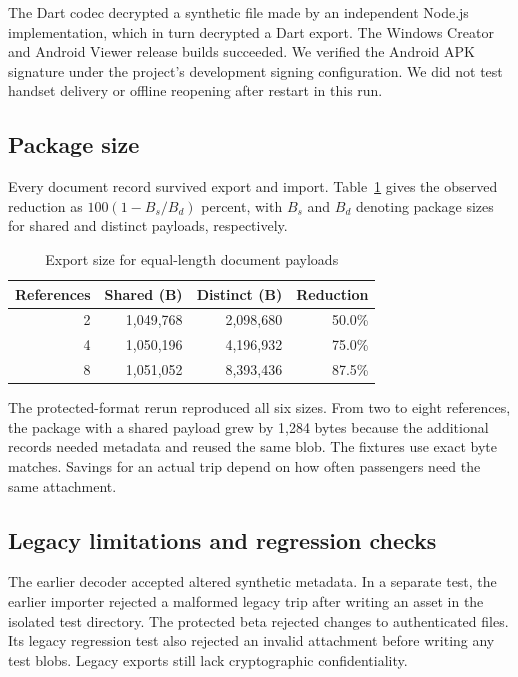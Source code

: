 The Dart codec decrypted a synthetic file made by an independent Node.js implementation, which in turn decrypted a Dart export. The Windows Creator and Android Viewer release builds succeeded. We verified the Android APK signature under the project's development signing configuration. We did not test handset delivery or offline reopening after restart in this run.

\subsection{Package size}
Every document record survived export and import. Table~\ref{tab:dedup} gives the observed reduction as $100(1-B_s/B_d)$ percent, with $B_s$ and $B_d$ denoting package sizes for shared and distinct payloads, respectively.

\begin{table}[t]
\caption{Export size for equal-length document payloads}
\label{tab:dedup}
\centering
\small
\begin{tabular}{rrrr}
\toprule
References & Shared (B) & Distinct (B) & Reduction \\
\midrule
2 & 1,049,768 & 2,098,680 & 50.0\% \\
4 & 1,050,196 & 4,196,932 & 75.0\% \\
8 & 1,051,052 & 8,393,436 & 87.5\% \\
\bottomrule
\end{tabular}
\end{table}

The protected-format rerun reproduced all six sizes. From two to eight references, the package with a shared payload grew by 1,284 bytes because the additional records needed metadata and reused the same blob. The fixtures use exact byte matches. Savings for an actual trip depend on how often passengers need the same attachment.

\subsection{Legacy limitations and regression checks}
The earlier decoder accepted altered synthetic metadata. In a separate test, the earlier importer rejected a malformed legacy trip after writing an asset in the isolated test directory. The protected beta rejected changes to authenticated files. Its legacy regression test also rejected an invalid attachment before writing any test blobs. Legacy exports still lack cryptographic confidentiality.
